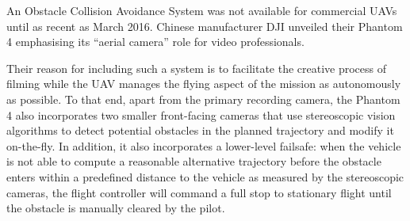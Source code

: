 An Obstacle Collision Avoidance System was not available for commercial UAVs until as recent as March 2016.
Chinese manufacturer DJI unveiled their Phantom 4 emphasising its ``aerial camera'' role for video professionals.

Their reason for including such a system is to facilitate the creative process of filming while the UAV manages the flying aspect of the mission as autonomously as possible.
To that end, apart from the primary recording camera, the Phantom 4 also incorporates two smaller front-facing cameras that use stereoscopic vision algorithms to detect potential obstacles in the planned trajectory and modify it on-the-fly.
In addition, it also incorporates a lower-level failsafe: when the vehicle is not able to compute a reasonable alternative trajectory before the obstacle enters within a predefined distance to the vehicle as measured by the stereoscopic cameras, the flight controller will command a full stop to stationary flight until the obstacle is manually cleared by the pilot.





% 
% 


